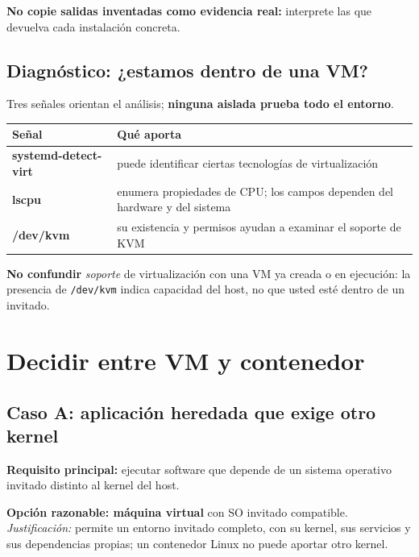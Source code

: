 \documentclass[11pt,a4paper]{article}
\newcommand{\cmd}[1]{\texttt{#1}}
\begin{document}
\begin{errorbox}
\textbf{No copie salidas inventadas como evidencia real:} interprete las que devuelva cada
instalación concreta.
\end{errorbox}

\subsection{Diagnóstico: ¿estamos dentro de una VM?}

Tres señales orientan el análisis; \textbf{ninguna aislada prueba todo el entorno}.

\begin{center}
\renewcommand{\arraystretch}{1.3}
\begin{tabularx}{\textwidth}{@{}>{\ttfamily\bfseries}l >{\raggedright\arraybackslash}X@{}}
\toprule
\textbf{\normalfont\color{azulprof} Señal} & \textbf{\color{azulprof} Qué aporta} \\
\midrule
systemd-detect-virt & puede identificar ciertas tecnologías de virtualización \\
lscpu               & enumera propiedades de CPU; los campos dependen del hardware y del sistema \\
/dev/kvm            & su existencia y permisos ayudan a examinar el soporte de KVM \\
\bottomrule
\end{tabularx}
\end{center}

\begin{aviso}
\textbf{No confundir} \emph{soporte} de virtualización con una VM ya creada o en ejecución:
la presencia de \cmd{/dev/kvm} indica capacidad del host, no que usted esté dentro de un invitado.
\end{aviso}

\section{Decidir entre VM y contenedor}

\subsection{Caso A: aplicación heredada que exige otro kernel}

\textbf{Requisito principal:} ejecutar software que depende de un sistema operativo invitado
distinto al kernel del host.

\begin{defbox}
\textbf{Opción razonable: máquina virtual} con SO invitado compatible.\\
\emph{Justificación:} permite un entorno invitado completo, con su kernel, sus servicios y
sus dependencias propias; un contenedor Linux no puede aportar otro kernel.
\end{defbox}
\end{document}
